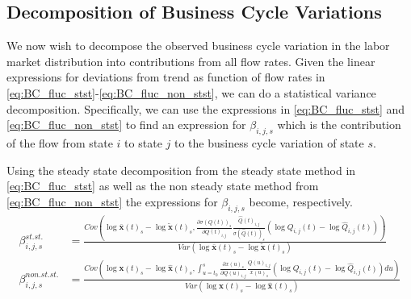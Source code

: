 \subsection{Decomposition of Business Cycle Variations}

We now wish to decompose the observed business cycle variation in the labor market distribution into contributions from all flow rates. Given the linear expressions for deviations from trend as function of flow rates in \eqref{eq:BC_fluc_stst}-\eqref{eq:BC_fluc_non_stst}, we can do a statistical variance decomposition. Specifically, we can use the expressions in \ref{eq:BC_fluc_stst} and \ref{eq:BC_fluc_non_stst} to find an expression for $\beta_{i,j,s}$ which is the contribution of the flow from state $i$ to state $j$ to the business cycle variation of state $s$. 

Using the steady state decomposition from the steady state method in \eqref{eq:BC_fluc_stst} as well as the non steady state method from \eqref{eq:BC_fluc_non_stst} the expressions for $\beta_{i,j,s}$ become, respectively.
\begin{align}
\beta_{i,j,s}^{st. st.}&=\frac{Cov \left( \log \mathbf{\bar{x}}(t)_s -\log \mathbf{\tilde{x}}(t)_s, \frac{\partial \sigma(Q(t))_s}{\partial Q(t)_{i,j}} \frac{\hat{Q}(t)_{i,j}}{\sigma(\hat{Q}(t))_s} \left( \log Q_{i,j}(t)-\log \hat{Q}_{i,j}(t)  \right) \right)}{Var \left( \log \mathbf{\bar{x}}(t)_s -\log \mathbf{\tilde{x}}(t)_s \right)} 
\label{eq:beta_stst}
\\
\beta_{i,j,s}^{non. st. st.}&=\frac{Cov \left(  \log \mathbf{x}(t) _s  -\log \mathbf{\hat{x}}(t)_s , \int_{u=t_0}^{s} \frac{\partial  x(u)_s}{\partial Q(u)_{i,j}} \frac{Q(u)_{i,j}}{ x(u)_s}\left( \log Q_{i,j}(t) - \log \hat{Q}_{i,j}(t)  \right) du\right)}{Var \left(\log \mathbf{x}(t) _s  -\log \mathbf{\hat{x}}(t)_s \right)}
\label{eq:beta_nonstst}
\end{align}




